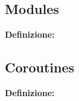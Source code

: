 \newpage

\subsection{Modules}

\textsf{\small \textbf{Definizione: } } \\

\newpage

\subsection{Coroutines}


\textsf{\small \textbf{Definizione: } } \\

